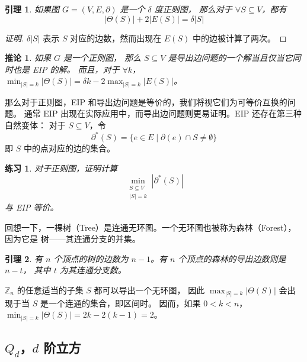 \documentclass[12pt, a4paper]{article}
\newtheorem{lemma}{引理}
\newtheorem{corollary}{推论}
\newtheorem{exercise}{练习}
\begin{document}
\begin{lemma}
\label{Lemma 1}
如果图 $G = (V, E, \partial)$ 是一个 $\delta$ 度正则图，
那么对于 $\forall S \subseteq V$，都有
\begin{equation*}
|\Theta(S)| + 2 |E(S)| = \delta |S|
\end{equation*}
\end{lemma}

\begin{proof}[证明]
$\delta |S|$ 表示 $S$ 对应的边数，然而出现在 $E(S)$ 中的边被计算了两次。
\end{proof}

\begin{corollary}
\label{Corollary 1}
如果 $G$ 是一个正则图，
那么 $S \subseteq V$ 是导出边问题的一个解当且仅当它同时也是 EIP 的解。
而且，对于 $\forall k$，$\min_{|S| = k} |\Theta(S)| = \delta k − 2 \max_{|S| = k} |E(S)|$。
\end{corollary}

那么对于正则图，EIP 和导出边问题是等价的，我们将视它们为可等价互换的问题。
通常 EIP 出现在实际应用中，而导出边问题则更易证明。EIP 还存在第三种自然变体：
对于 $S \subseteq V$，令
\begin{equation*}
\partial^\ast(S) = \{e \in E \mid \partial(e) \cap S \neq \emptyset\}
\end{equation*}
即 $S$ 中的点对应的边的集合。

\begin{exercise}
\label{Exercise 1}
对于正则图，证明计算
\begin{equation*}
\min_{\substack{
	S \subseteq V \\
	|S| = k
}}|\partial^\ast(S)|
\end{equation*}
与 EIP 等价。
\end{exercise}

回想一下，一棵树（Tree）是连通无环图。一个无环图也被称为森林（Forest），因为它是
树——其连通分支的并集。

\begin{lemma}
\label{Lemma 2}
有 $n$ 个顶点的树的边数为 $n − 1$。有 $n$ 个顶点的森林的导出边数则是 $n - t$，
其中 $t$ 为其连通分支数。
\end{lemma}

$\mathbb{Z}_n$ 的任意适当的子集 $S$ 都可以导出一个无环图，
因此 $\max_{|S| = k} |\Theta(S)|$ 会出现于当 $S$ 是一个连通的集合，即区间时。
因而，如果 $0 < k < n$，$\min_{|S| = k} |\Theta(S)| = 2 k − 2 (k − 1) = 2$。

\subsection{$Q_d$，$d$ 阶立方}
\label{Subsection 2.3}
\end{document}
